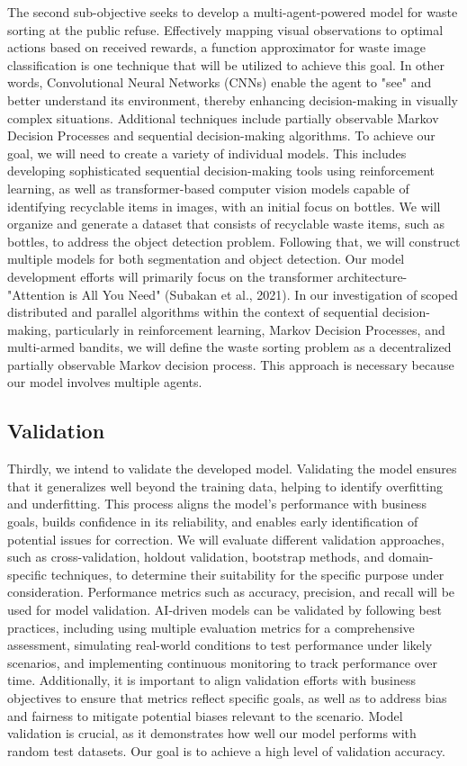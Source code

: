 The second sub-objective seeks to develop a multi-agent-powered model for waste sorting at the public refuse. Effectively mapping visual observations to optimal actions based on received rewards, a function approximator for waste image classification is one technique that will be utilized to achieve this goal. In other words, Convolutional Neural Networks (CNNs) enable the agent to "see" and better understand its environment, thereby enhancing decision-making in visually complex situations. Additional techniques include partially observable Markov Decision Processes and sequential decision-making algorithms. To achieve our goal, we will need to create a variety of individual models. This includes developing sophisticated sequential decision-making tools using reinforcement learning, as well as transformer-based computer vision models capable of identifying recyclable items in images, with an initial focus on bottles. We will organize and generate a dataset that consists of recyclable waste items, such as bottles, to address the object detection problem. Following that, we will construct multiple models for both segmentation and object detection. Our model development efforts will primarily focus on the transformer architecture-"Attention is All You Need" (Subakan et al., 2021).
In our investigation of scoped distributed and parallel algorithms within the context of sequential decision-making, particularly in reinforcement learning, Markov Decision Processes, and multi-armed bandits, we will define the waste sorting problem as a decentralized partially observable Markov decision process. This approach is necessary because our model involves multiple agents.


\subsection{Validation}
\label{sub:obj-valid}  

Thirdly, we intend to validate the developed model. Validating the model ensures that it generalizes well beyond the training data, helping to identify overfitting and underfitting. This process aligns the model's performance with business goals, builds confidence in its reliability, and enables early identification of potential issues for correction. We will evaluate different validation approaches, such as cross-validation, holdout validation, bootstrap methods, and domain-specific techniques, to determine their suitability for the specific purpose under consideration. Performance metrics such as accuracy, precision, and recall will be used for model validation. AI-driven models can be validated by following best practices, including using multiple evaluation metrics for a comprehensive assessment, simulating real-world conditions to test performance under likely scenarios, and implementing continuous monitoring to track performance over time. Additionally, it is important to align validation efforts with business objectives to ensure that metrics reflect specific goals, as well as to address bias and fairness to mitigate potential biases relevant to the scenario. Model validation is crucial, as it demonstrates how well our model performs with random test datasets. Our goal is to achieve a high level of validation accuracy.


